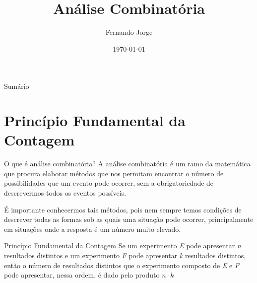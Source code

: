 \documentclass[aspectratio=169,xcolor=dvipsnames]{beamer}
\title[short title]{Análise Combinatória} %
\author[Fernando-Jorge] {Fernando Jorge}
\institute[NTU] %
{
  Escola Estadual Professor Lima Castro
}
\date{\today} %
\begin{document}
\begin{frame}
    \titlepage
\end{frame}

\begin{frame}{Sumário}
    \tableofcontents
\end{frame}

\section{Princípio Fundamental da Contagem}

\begin{frame}{O que é análise combinatória?}
A análise combinatória é um ramo da matemática que procura elaborar métodos que nos permitam encontrar o número de possibilidades que um evento pode ocorrer, sem a obrigatoriedade de descrevermos todos os eventos possíveis.

 É importante conhecermos tais métodos, pois nem sempre temos condições de descrever todas as formas sob as quais uma situação pode ocorrer, principalmente em situações onde a resposta é um número muito elevado.

\end{frame}


\begin{frame}{Princípio Fundamental da Contagem}
    Se um experimento \textit{E} pode apresentar \textit{n} resultados distintos e um experimento \textit{F} pode
    apresentar \textit{k} resultados distintos, então o número de resultados distintos que o experimento composto
    de \textit{E} e \textit{F} pode apresentar, nessa ordem, é dado pelo produto $n \cdot k$
\end{frame}

\end{document}
